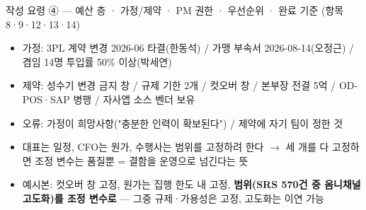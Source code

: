 \begin{frame}[allowframebreaks=1.0]{작성 요령 ④ — 예산 층 · 가정/제약 · PM 권한 · 우선순위 · 완료 기준 (항목 8·9·12·13·14)}
\small
\par\smallskip{}\nobreak
\par\smallskip{}\nobreak
\begin{itemize}
\item\relax 가정: 3PL 계약 변경 2026-06 타결(한동석) / 가맹 부속서 2026-08-14(오정근) / 겸임 14명 투입률 50\% 이상(박세연)
\item\relax 제약: 성수기 변경 금지 창 / 규제 기한 2개 / 컷오버 창 / 본부장 전결 5억 / OD-POS·SAP 병행 / 자사앱 소스 벤더 보유
\item\relax 오류: 가정이 희망사항("충분한 인력이 확보된다") / 제약에 자기 팀이 정한 것
\end{itemize}
\par\smallskip{}\nobreak
\par\smallskip{}\nobreak
\begin{itemize}
\item\relax 대표는 일정, CFO는 원가, 수행사는 범위를 고정하려 한다 $\rightarrow$ 세 개를 다 고정하면 조정 변수는 품질뿐 = 결함을 운영으로 넘긴다는 뜻
\item\relax 예시본: 컷오버 창 고정, 원가는 집행 한도 내 고정, \textbf{범위(SRS 570건 중 옴니채널 고도화)를 조정 변수로} — 그중 규제·가용성은 고정, 고도화는 이연 가능
\end{itemize}

\end{frame}
